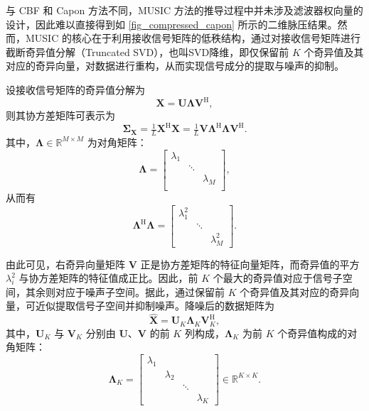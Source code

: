 与 CBF 和 Capon 方法不同，MUSIC 方法的推导过程中并未涉及滤波器权向量的设计，因此难以直接得到如 \cref{fig_compressed_capon} 所示的二维脉压结果。然而，MUSIC 的核心在于利用接收信号矩阵的低秩结构，通过对接收信号矩阵进行截断奇异值分解（Truncated SVD），也叫SVD降维，即仅保留前 \(K\) 个奇异值及其对应的奇异向量，对数据进行重构，从而实现信号成分的提取与噪声的抑制。

设接收信号矩阵的奇异值分解为
\[
    \mathbf{X} = \mathbf{U}\mathbf{\Lambda}\mathbf{V}^{\mathrm{H}},
\]
则其协方差矩阵可表示为
\[
    \mathbf{\Sigma}_{\mathbf{X}}
    = \tfrac{1}{L}\mathbf{X}^{\mathrm{H}}\mathbf{X}
    = \tfrac{1}{L}\mathbf{V}\mathbf{\Lambda}^{\mathrm{H}}\mathbf{\Lambda}\mathbf{V}^{\mathrm{H}}.
\]
其中，\(\mathbf{\Lambda}\in\mathbb{R}^{M\times M}\) 为对角矩阵：
\[
    \mathbf{\Lambda} = \begin{bmatrix}
        \lambda_1 &        &           \\
                  & \ddots &           \\
                  &        & \lambda_M \\
    \end{bmatrix},
\]
从而有
\[
    \mathbf{\Lambda}^{\mathrm{H}} \mathbf{\Lambda} = \begin{bmatrix}
        \lambda_1^2 &        &             \\
                    & \ddots &             \\
                    &        & \lambda_M^2
    \end{bmatrix}.
\]

由此可见，右奇异向量矩阵 \(\mathbf{V}\) 正是协方差矩阵的特征向量矩阵，而奇异值的平方 \(\lambda_i^2\) 与协方差矩阵的特征值成正比。因此，前 \(K\) 个最大的奇异值对应于信号子空间，其余则对应于噪声子空间。据此，通过保留前 \(K\) 个奇异值及其对应的奇异向量，可近似提取信号子空间并抑制噪声。降噪后的数据矩阵为
\[
    \hat{\mathbf{X}} = \mathbf{U}_K \mathbf{\Lambda}_K \mathbf{V}_K^{\mathrm{H}},
\]
其中，\(\mathbf{U}_K\) 与 \(\mathbf{V}_K\) 分别由 \(\mathbf{U}\)、\(\mathbf{V}\) 的前 \(K\) 列构成，\(\mathbf{\Lambda}_K\) 为前 \(K\) 个奇异值构成的对角矩阵：
\[
    \mathbf{\Lambda}_K =
    \begin{bmatrix}
        \lambda_1 &           &        &           \\
                  & \lambda_2 &        &           \\
                  &           & \ddots &           \\
                  &           &        & \lambda_K
    \end{bmatrix} \in \mathbb{R}^{K\times K}.
\]

